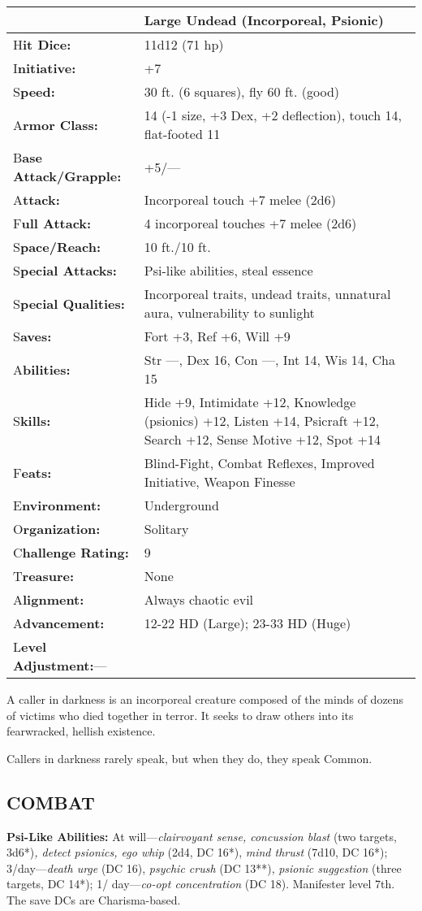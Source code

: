 \documentclass{article}
\begin{document}
\begin{tabular}{|>{\raggedright}p{78pt}|>{\raggedright}p{247pt}|}
\hline
  & Large Undead (Incorporeal, Psionic)\tabularnewline
\hline
H\textbf{it Dice:} & 11d12 (71 hp)\tabularnewline
\hline
I\textbf{nitiative:} & +7\tabularnewline
\hline
S\textbf{peed:} & 30 ft. (6 squares), fly 60 ft. (good)\tabularnewline
\hline
A\textbf{rmor Class:} & 14 (-1 size, +3 Dex, +2 deflection), touch 14, flat-footed 
11\tabularnewline
\hline
B\textbf{ase Attack/Grapple:} & +5/---\tabularnewline
\hline
A\textbf{ttack:} & Incorporeal touch +7 melee (2d6)\tabularnewline
\hline
F\textbf{ull Attack:} & 4 incorporeal touches +7 melee (2d6)\tabularnewline
\hline
S\textbf{pace/Reach:} & 10 ft./10 ft.\tabularnewline
\hline
S\textbf{pecial Attacks:} & Psi-like abilities, steal essence\tabularnewline
\hline
S\textbf{pecial Qualities:} & Incorporeal traits, undead traits, unnatural aura, 
vulnerability to sunlight\tabularnewline
\hline
S\textbf{aves:} & Fort +3, Ref +6, Will +9\tabularnewline
\hline
A\textbf{bilities:} & Str ---, Dex 16, Con ---, Int 14, Wis 14, Cha 15\tabularnewline
\hline
S\textbf{kills:} & Hide +9, Intimidate +12, Knowledge (psionics) +12, Listen +14, 
Psicraft +12, Search +12, Sense Motive +12, Spot +14\tabularnewline
\hline
F\textbf{eats:} & Blind-Fight, Combat Reflexes, Improved Initiative, Weapon Finesse 
\tabularnewline
\hline
E\textbf{nvironment:} & Underground\tabularnewline
\hline
O\textbf{rganization:} & Solitary\tabularnewline
\hline
C\textbf{hallenge Rating:} & 9\tabularnewline
\hline
T\textbf{reasure:} & None\tabularnewline
\hline
A\textbf{lignment:} & Always chaotic evil\tabularnewline
\hline
A\textbf{dvancement:} & 12-22 HD (Large); 23-33 HD (Huge)\tabularnewline
\hline
L\textbf{evel Adjustment:}--- & \tabularnewline
\hline
\end{tabular}

A caller in darkness is an incorporeal creature composed of the minds of dozens 
of victims who died together in terror. It seeks to draw others into its fearwracked, 
hellish existence.

Callers in darkness rarely speak, but when they do, they speak Common.

\subsection*{COMBAT}

\textbf{Psi-Like Abilities: }At will---\textit{clairvoyant sense, concussion blast 
}(two targets, 3d6*)\textit{, detect psionics, ego whip }(2d4, DC 16*), \textit{mind 
thrust }(7d10, DC 16*); 3/day---\textit{death urge }(DC 16), \textit{psychic crush 
}(DC 13**), \textit{psionic suggestion }(three targets, DC 14*); 1/ day---\textit{co-opt 
concentration }(DC 18). Manifester level 7th. The save DCs are Charisma-based.
\end{document}
